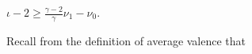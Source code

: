 $\iota - 2 \geq \frac{\gamma - 2}{\gamma} \nu_1 - \nu_0$.

Recall from the definition of average valence that
